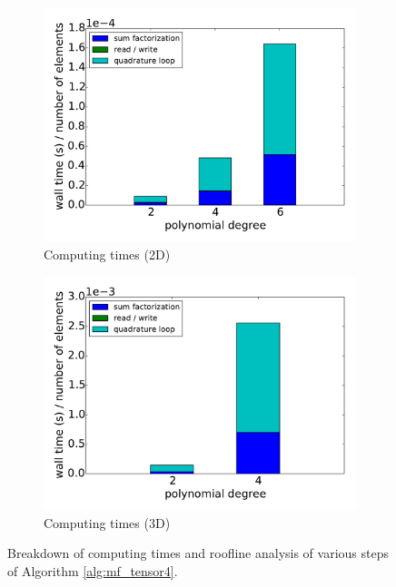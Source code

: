 \documentclass[times,doublespace]{nmeauth}
\begin{document}
\begin{figure}[!ht]
\begin{subfigure}[b]{0.49\textwidth}
      \centering
      \includegraphics[width=\textwidth]{LIKWID_Emmy_RRZE_breakdown_stackedbar_2d.pdf}
      \caption{Computing times (2D)}
      \label{fig:breakdown_stackedbar_2d_tensor4}
  \end{subfigure}
  \begin{subfigure}[b]{0.49\textwidth}
    \centering
    \includegraphics[width=\textwidth]{LIKWID_Emmy_RRZE_breakdown_stackedbar_3d.pdf}
    \caption{Computing times (3D)}
    \label{fig:breakdown_stackedbar_3d_tensor4}
  \end{subfigure}
  \caption{Breakdown of computing times and roofline analysis of various steps of Algorithm \ref{alg:mf_tensor4}.}%
  \label{fig:breakdown}
\end{figure}
\end{document}

